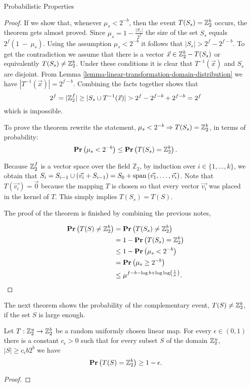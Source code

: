 \begin{section}{Probabilistic Properties}
\begin{proof}
If we show that, whenever $\mu_s < 2^{-b}$, then the event $T(S_s) = \mathbb{Z}_{2}^{b}$ occurs, the theorem gets almost proved. Since $\mu_s = 1 - \frac{|S_s|}{2 ^ f}$ the size of the set $S_s$ equals ${2 ^ f}(1~-~\mu_s)$. Using the assumption $\mu_s < 2 ^ {-b}$ it follows that $|S_s| > 2 ^ f - 2 ^ {f - b}$. To get the contradiction we assume that there is a vector $\vec{x} \in \mathbb{Z}_{2}^{b} - T(S_s)$ or equivalently $T(S_s) \neq \mathbb{Z}_{2}^{b}$. Under these conditions it is clear that $T ^ {-1}(\vec{x})$ and $S_s$ are disjoint. From Lemma \ref{lemma-linear-transformation-domain-distribution} we have $|T ^ {-1}(\vec{x})| = 2 ^ {f - b}$. Combining the facts together shows that
\[
2 ^ f = |\mathbb{Z}_{2}^{f}| \geq |S_s \cup T^{-1}(\vec{x})| > 2 ^ f - 2 ^ {f - b} + 2 ^ {f - b} = 2 ^ f
\] which is impossible. 

To prove the theorem rewrite the statement, $\mu_s < 2 ^ {-b} \Rightarrow T(S_s) = \mathbb{Z}_{2}^{b}$, in terms of probability:
\[
	\mathbf{Pr}\left(\mu_s < 2^{-b}\right) \leq \mathbf{Pr}\left(T(S_s) = \mathbb{Z}_{2}^{b}\right) \text{.}
\]

Because $\mathbb{Z}_{2}^{f}$ is a vector space over the field $\mathbb{Z}_2$, by induction over $i \in \{ 1, \dots, k \}$, we obtain that $S_i = S_{i - 1} \cup (\vec{v_i} + S_{i - 1}) = S_0 + \mathrm{span}\left({\vec{v_1}, \dots, \vec{v_i}}\right)$. Note that $T(\vec{v_i}) = \vec{0}$ because the mapping $T$ is chosen so that every vector $\vec{v_i}$ was placed in the kernel of $T$. This simply implies $T(S_s) = T(S)$.

The proof of the theorem is finished by combining the previous notes,

\[
\begin{split}
\mathbf{Pr}\left(T(S) \neq \mathbb{Z}_{2}^{b}\right) 
	& = \mathbf{Pr}\left(T(S_s) \neq \mathbb{Z}_{2}^{b}\right)  \\
	& = 1 - \mathbf{Pr}\left(T(S_s) = \mathbb{Z}_{2}^{b}\right) \\
	& \leq 1 - \mathbf{Pr}\left(\mu_s < 2 ^ {-b}\right) \\
	& = \mathbf{Pr}\left(\mu_s \geq 2 ^ {-b}\right) \\
	& \leq \mu ^ {f - b - \log b + \log \log \left(\frac{1}{\mu}\right)} \text{.}
\end{split}
\]
\end{proof}

The next theorem shows the probability of the complementary event, $T(S) \neq \mathbb{Z}_{2}^{b}$, if the set $S$ is large enough.
\begin{theorem}
\label{theorem-set-onto-by-linear-transform}
Let $T: \mathbb{Z}_{2}^{u} \rightarrow \mathbb{Z}_{2}^{b}$ be a random uniformly chosen linear map. For every $\epsilon \in (0, 1)$ there is a constant $c_\epsilon > 0$ such that for every subset $S$ of the domain $\mathbb{Z}_{2}^{u}$, $|S| \geq c_\epsilon b 2 ^ b$ we have
\[
	\mathbf{Pr}\left(T(S) = \mathbb{Z}_{2}^{b}\right) \geq 1 - \epsilon \text{.}
\]
\end{theorem}
\begin{proof}

\end{proof}


\end{section}
